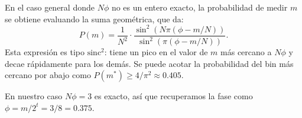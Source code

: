 \begin{enumerate}[a)]
	      En el caso general donde $N\phi$ no es un entero exacto, la probabilidad de medir $m$ se obtiene evaluando la suma geométrica, que da:
	      \[
		      P(m) = \frac{1}{N^2} \cdot \frac{\sin^2(N\pi(\phi - m/N))}{\sin^2(\pi(\phi - m/N))}.
	      \]
	      Esta expresión es tipo $\text{sinc}^2$: tiene un pico en el valor de $m$ más cercano a $N\phi$ y decae rápidamente para los demás. Se puede acotar la probabilidad del bin más cercano por abajo como $P(m^*) \geq 4/\pi^2 \approx 0.405$.

	      En nuestro caso $N\phi = 3$ es exacto, así que recuperamos la fase como $\phi = m/2^t = 3/8 = 0.375$.

\end{enumerate}

